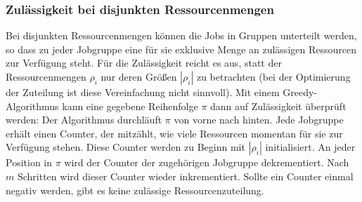 \documentclass{scrreprt}
\begin{document}
\subsubsection{Zulässigkeit bei disjunkten Ressourcenmengen}
Bei disjunkten Ressourcenmengen können die Jobs in Gruppen unterteilt werden, 
so dass zu jeder Jobgruppe eine für sie exklusive Menge an zulässigen Ressourcen zur Verfügung steht.
Für die Zulässigkeit reicht es aus, statt der Ressourcenmengen $\rho_i$ nur deren Größen $|\rho_i|$ zu betrachten
(bei der Optimierung der Zuteilung ist diese Vereinfachung nicht sinnvoll).
Mit einem Greedy-Algorithmus kann eine gegebene Reihenfolge $\pi$ dann auf Zulässigkeit überprüft werden:
Der Algorithmus durchläuft $\pi$ von vorne nach hinten.
Jede Jobgruppe erhält einen Counter, der mitzählt, wie viele Ressourcen momentan für sie zur Verfügung stehen.
Diese Counter werden zu Beginn mit $|\rho_i|$ initialisiert.
An jeder Position in $\pi$ wird der Counter der zugehörigen Jobgruppe dekrementiert.
Nach $m$ Schritten wird dieser Counter wieder inkrementiert.
Sollte ein Counter einmal negativ werden, gibt es keine zulässige Ressourcenzuteilung.
\end{document}
